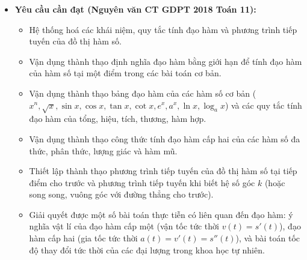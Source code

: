 \documentclass[12pt, a4paper]{article}
\begin{document}
\begin{itemize}[leftmargin=1.2cm]
    \item \textbf{Yêu cầu cần đạt (Nguyên văn CT GDPT 2018 Toán 11):}
    \begin{itemize}[leftmargin=0.6cm]
        \item Hệ thống hoá các khái niệm, quy tắc tính đạo hàm và phương trình tiếp tuyến của đồ thị hàm số.
        \item Vận dụng thành thạo định nghĩa đạo hàm bằng giới hạn để tính đạo hàm của hàm số tại một điểm trong các bài toán cơ bản.
        \item Vận dụng thành thạo bảng đạo hàm của các hàm số cơ bản ($x^n, \sqrt{x}, \sin x, \cos x, \tan x, \cot x, e^x, a^x, \ln x, \log_a x$) và các quy tắc tính đạo hàm của tổng, hiệu, tích, thương, hàm hợp.
        \item Vận dụng thành thạo công thức tính đạo hàm cấp hai của các hàm số đa thức, phân thức, lượng giác và hàm mũ.
        \item Thiết lập thành thạo phương trình tiếp tuyến của đồ thị hàm số tại tiếp điểm cho trước và phương trình tiếp tuyến khi biết hệ số góc $k$ (hoặc song song, vuông góc với đường thẳng cho trước).
        \item Giải quyết được một số bài toán thực tiễn có liên quan đến đạo hàm: ý nghĩa vật lí của đạo hàm cấp một (vận tốc tức thời $v(t) = s'(t)$), đạo hàm cấp hai (gia tốc tức thời $a(t) = v'(t) = s''(t)$), và bài toán tốc độ thay đổi tức thời của các đại lượng trong khoa học tự nhiên.
    \end{itemize}


\end{itemize}
\end{document}
